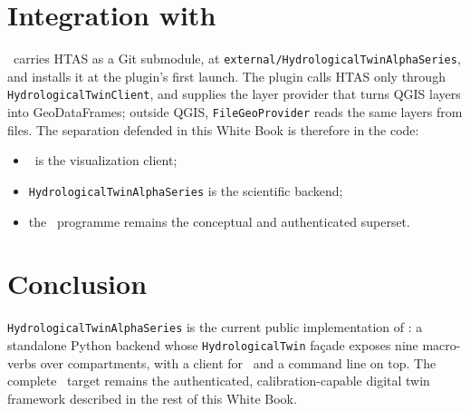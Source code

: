 
\section{Integration with \cwv}

\cwv\ carries HTAS as a Git submodule, at
\texttt{external/HydrologicalTwinAlphaSeries}, and installs it at the
plugin's first launch. The plugin calls HTAS only through
\texttt{HydrologicalTwinClient}, and supplies the layer provider that turns
QGIS layers into GeoDataFrames; outside QGIS, \texttt{FileGeoProvider} reads
the same layers from files. The separation defended in this White Book is
therefore in the code:

\begin{itemize}
    \item \cwv\ is the visualization client;
    \item \texttt{HydrologicalTwinAlphaSeries} is the scientific backend;
    \item the \hydrot\ programme remains the conceptual and authenticated superset.
\end{itemize}


\section{Conclusion}

\texttt{HydrologicalTwinAlphaSeries} is the current public implementation of
\hydrot: a standalone Python backend whose \texttt{HydrologicalTwin} façade
exposes nine macro-verbs over compartments, with a client for \cwv\ and a
command line on top. The complete \hydrot\ target remains the authenticated,
calibration-capable digital twin framework described in the rest of this
White Book.
